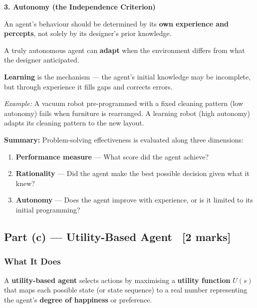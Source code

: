 \documentclass[12pt, a4paper]{article}
\newenvironment{answerbox}{\begin{mdframed}[style=answerframe]}{\end{mdframed}}
\begin{document}
\vspace{0.4em}

\noindent\textbf{3. Autonomy (the Independence Criterion)}

\begin{keypoints}
  \item An agent's behaviour should be determined by its \textbf{own experience and percepts}, not solely by its designer's prior knowledge.
  \item A truly autonomous agent can \textbf{adapt} when the environment differs from what the designer anticipated.
  \item \textbf{Learning} is the mechanism — the agent's initial knowledge may be incomplete, but through experience it fills gaps and corrects errors.
  \item \emph{Example:} A vacuum robot pre-programmed with a fixed cleaning pattern (low autonomy) fails when furniture is rearranged. A learning robot (high autonomy) adapts its cleaning pattern to the new layout.
\end{keypoints}

\begin{answerbox}
\textbf{Summary:} Problem-solving effectiveness is evaluated along three dimensions:
\begin{enumerate}[noitemsep]
  \item \textbf{Performance measure} — What score did the agent achieve?
  \item \textbf{Rationality} — Did the agent make the best possible decision given what it knew?
  \item \textbf{Autonomy} — Does the agent improve with experience, or is it limited to its initial programming?
\end{enumerate}
\end{answerbox}

\subsection{Part (c) — Utility-Based Agent \ [2 marks]}

\subsubsection*{What It Does}

\noindent A \textbf{utility-based agent} selects actions by maximising a \textbf{utility function} $U(s)$ that maps each possible state (or state sequence) to a real number representing the agent's \textbf{degree of happiness} or preference.
\end{document}
